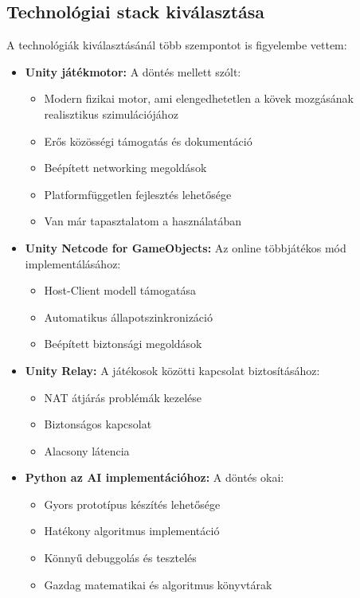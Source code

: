 \subsection{Technológiai stack kiválasztása}
A technológiák kiválasztásánál több szempontot is figyelembe vettem:
\begin{itemize}
	\item \textbf{Unity játékmotor:} A döntés mellett szólt:
	\begin{itemize}
		\item Modern fizikai motor, ami elengedhetetlen a kövek mozgásának realisztikus szimulációjához
		\item Erős közösségi támogatás és dokumentáció
		\item Beépített networking megoldások
		\item Platformfüggetlen fejlesztés lehetősége
		\item Van már tapasztalatom a használatában
	\end{itemize}
	\item \textbf{Unity Netcode for GameObjects:} Az online többjátékos mód implementálásához:
	\begin{itemize}
		\item Host-Client modell támogatása
		\item Automatikus állapotszinkronizáció
		\item Beépített biztonsági megoldások
	\end{itemize}
	
	\item \textbf{Unity Relay:} A játékosok közötti kapcsolat biztosításához:
	\begin{itemize}
		\item NAT átjárás problémák kezelése
		\item Biztonságos kapcsolat
		\item Alacsony látencia
	\end{itemize}
	
	\item \textbf{Python az AI implementációhoz:} A döntés okai:
	\begin{itemize}
		\item Gyors prototípus készítés lehetősége
		\item Hatékony algoritmus implementáció
		\item Könnyű debuggolás és tesztelés
		\item Gazdag matematikai és algoritmus könyvtárak
	\end{itemize}
\end{itemize}
